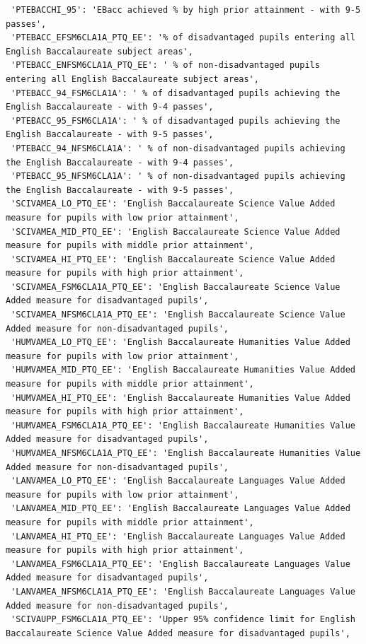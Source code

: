 \documentclass[
  letterpaper,
  DIV=11,
  numbers=noendperiod]{scrartcl}
\begin{document}
\begin{verbatim}
 'PTEBACCHI_95': 'EBacc achieved % by high prior attainment - with 9-5 passes',
 'PTEBACC_EFSM6CLA1A_PTQ_EE': '% of disadvantaged pupils entering all English Baccalaureate subject areas',
 'PTEBACC_ENFSM6CLA1A_PTQ_EE': ' % of non-disadvantaged pupils entering all English Baccalaureate subject areas',
 'PTEBACC_94_FSM6CLA1A': ' % of disadvantaged pupils achieving the English Baccalaureate - with 9-4 passes',
 'PTEBACC_95_FSM6CLA1A': ' % of disadvantaged pupils achieving the English Baccalaureate - with 9-5 passes',
 'PTEBACC_94_NFSM6CLA1A': ' % of non-disadvantaged pupils achieving the English Baccalaureate - with 9-4 passes',
 'PTEBACC_95_NFSM6CLA1A': ' % of non-disadvantaged pupils achieving the English Baccalaureate - with 9-5 passes',
 'SCIVAMEA_LO_PTQ_EE': 'English Baccalaureate Science Value Added measure for pupils with low prior attainment',
 'SCIVAMEA_MID_PTQ_EE': 'English Baccalaureate Science Value Added measure for pupils with middle prior attainment',
 'SCIVAMEA_HI_PTQ_EE': 'English Baccalaureate Science Value Added measure for pupils with high prior attainment',
 'SCIVAMEA_FSM6CLA1A_PTQ_EE': 'English Baccalaureate Science Value Added measure for disadvantaged pupils',
 'SCIVAMEA_NFSM6CLA1A_PTQ_EE': 'English Baccalaureate Science Value Added measure for non-disadvantaged pupils',
 'HUMVAMEA_LO_PTQ_EE': 'English Baccalaureate Humanities Value Added measure for pupils with low prior attainment',
 'HUMVAMEA_MID_PTQ_EE': 'English Baccalaureate Humanities Value Added measure for pupils with middle prior attainment',
 'HUMVAMEA_HI_PTQ_EE': 'English Baccalaureate Humanities Value Added measure for pupils with high prior attainment',
 'HUMVAMEA_FSM6CLA1A_PTQ_EE': 'English Baccalaureate Humanities Value Added measure for disadvantaged pupils',
 'HUMVAMEA_NFSM6CLA1A_PTQ_EE': 'English Baccalaureate Humanities Value Added measure for non-disadvantaged pupils',
 'LANVAMEA_LO_PTQ_EE': 'English Baccalaureate Languages Value Added measure for pupils with low prior attainment',
 'LANVAMEA_MID_PTQ_EE': 'English Baccalaureate Languages Value Added measure for pupils with middle prior attainment',
 'LANVAMEA_HI_PTQ_EE': 'English Baccalaureate Languages Value Added measure for pupils with high prior attainment',
 'LANVAMEA_FSM6CLA1A_PTQ_EE': 'English Baccalaureate Languages Value Added measure for disadvantaged pupils',
 'LANVAMEA_NFSM6CLA1A_PTQ_EE': 'English Baccalaureate Languages Value Added measure for non-disadvantaged pupils',
 'SCIVAUPP_FSM6CLA1A_PTQ_EE': 'Upper 95% confidence limit for English Baccalaureate Science Value Added measure for disadvantaged pupils',

\end{verbatim}
\end{document}
